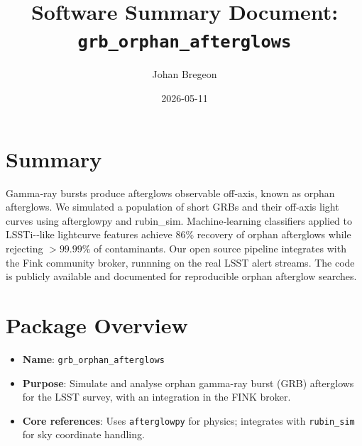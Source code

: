 \documentclass{article}
\title{Software Summary Document: \\
\texttt{grb\_orphan\_afterglows}}
\author{Johan Bregeon}
\date{2026-05-11}
\begin{document}
\maketitle

\section*{Summary}
Gamma‑ray bursts produce afterglows observable off‑axis, known as orphan afterglows.
We simulated a population of short GRBs and their off‑axis light curves using afterglowpy and rubin\_sim.
Machine‑learning classifiers applied to LSSTi-‑like lightcurve features achieve 86\% recovery of orphan afterglows while rejecting $>99.99$\% of contaminants.
Our open source pipeline integrates with the Fink community broker, runnning on the real LSST alert streams.
The code is publicly available and documented for reproducible orphan afterglow searches.

\section*{Package Overview}
\begin{itemize}
  \item \textbf{Name}: \texttt{grb\_orphan\_afterglows}
  \item \textbf{Purpose}: Simulate and analyse orphan gamma-ray burst (GRB) afterglows for the LSST survey, with an integration in the FINK broker.
  \item \textbf{Core references}: Uses \texttt{afterglowpy} for physics; integrates with \texttt{rubin\_sim} for sky coordinate handling.
\end{itemize}
\end{document}
